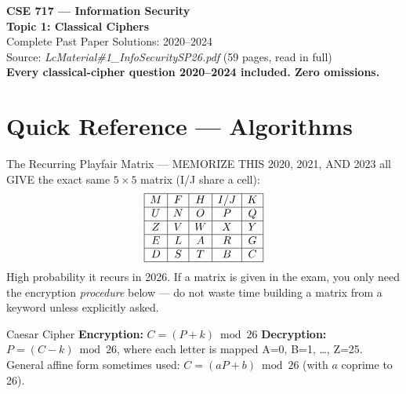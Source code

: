 \documentclass[12pt,a4paper]{article}
\begin{document}
\begin{center}
{\LARGE\bfseries\color{folblue} CSE 717 --- Information Security}\\[4pt]
{\large\bfseries Topic 1: Classical Ciphers}\\[2pt]
{\large Complete Past Paper Solutions: 2020--2024}\\[6pt]
{\normalsize Source: \textit{LcMaterial\#1\_InfoSecuritySP26.pdf} (59 pages, read in full)}\\[2pt]
{\normalsize\color{darkred}\textbf{Every classical-cipher question 2020--2024 included. Zero omissions.}}
\end{center}

\tableofcontents
\newpage

\section*{Quick Reference --- Algorithms}

\begin{keybox}{The Recurring Playfair Matrix --- MEMORIZE THIS}
2020, 2021, AND 2023 all GIVE the exact same $5\times5$ matrix (I/J share a cell):
\[
\begin{array}{|c|c|c|c|c|}
\hline
M & F & H & I/J & K \\\hline
U & N & O & P & Q \\\hline
Z & V & W & X & Y \\\hline
E & L & A & R & G \\\hline
D & S & T & B & C \\\hline
\end{array}
\]
High probability it recurs in 2026. If a matrix is given in the exam, you only need the encryption \emph{procedure} below --- do not waste time building a matrix from a keyword unless explicitly asked.
\end{keybox}

\begin{algobox}{Caesar Cipher}
\textbf{Encryption:} $C = (P + k) \bmod 26$ \quad \textbf{Decryption:} $P = (C - k) \bmod 26$,
where each letter is mapped A=0, B=1, \dots, Z=25.
General affine form sometimes used: $C=(aP+b)\bmod 26$ (with $a$ coprime to 26).
\end{algobox}
\end{document}

